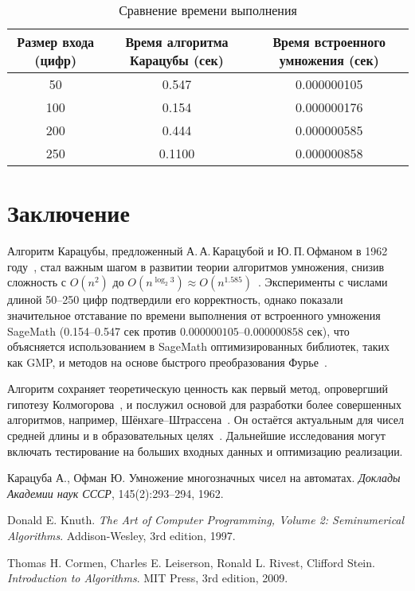 \documentclass[11pt]{article}
\begin{document}
\begin{table}[h]
\centering
\begin{tabular}{|c|c|c|}
\hline
Размер входа (цифр) & Время алгоритма Карацубы (сек) & Время встроенного умножения (сек) \\
\hline
50 & 0.547 & 0.000000105 \\
100 & 0.154 & 0.000000176 \\
200 & 0.444 & 0.000000585 \\
250 & 0.1100 & 0.000000858 \\
\hline
\end{tabular}
\caption{Сравнение времени выполнения}
\label{tab:performance}
\end{table}

\section{Заключение}
Алгоритм Карацубы, предложенный А.\,А.\,Карацубой и Ю.\,П.\,Офманом в 1962 году~\cite{karatsuba1962}, стал важным шагом в развитии теории алгоритмов умножения, снизив сложность с $O(n^2)$ до $O(n^{\log_2 3}) \approx O(n^{1.585})$~\cite{knuth1997}. Эксперименты с числами длиной 50–250 цифр подтвердили его корректность, однако показали значительное отставание по времени выполнения от встроенного умножения SageMath (0.154–0.547 сек против $0.000000105$–$0.000000858$ сек), что объясняется использованием в SageMath оптимизированных библиотек, таких как GMP, и методов на основе быстрого преобразования Фурье~\cite{cormen2009}.

Алгоритм сохраняет теоретическую ценность как первый метод, опровергший гипотезу Колмогорова~\cite{karatsuba1962}, и послужил основой для разработки более совершенных алгоритмов, например, Шёнхаге--Штрассена~\cite{cormen2009}. Он остаётся актуальным для чисел средней длины и в образовательных целях~\cite{knuth1997}. Дальнейшие исследования могут включать тестирование на больших входных данных и оптимизацию реализации.

\begin{thebibliography}{9}
  Карацуба А., Офман Ю.
  Умножение многозначных чисел на автоматах.
  \emph{Доклады Академии наук СССР}, 145(2):293--294, 1962.

  Donald E. Knuth.
  \emph{The Art of Computer Programming, Volume 2: Seminumerical Algorithms}.
  Addison-Wesley, 3rd edition, 1997.

  Thomas H. Cormen, Charles E. Leiserson, Ronald L. Rivest, Clifford Stein.
  \emph{Introduction to Algorithms}.
  MIT Press, 3rd edition, 2009.
\end{thebibliography}
\end{document}
